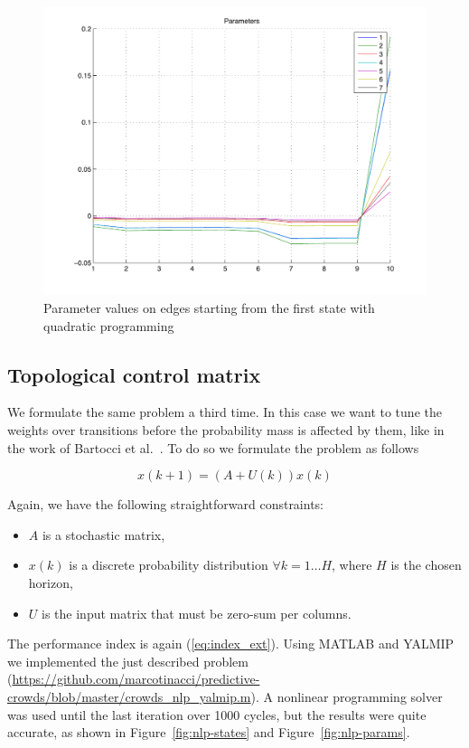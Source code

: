 \documentclass[a4paper, 11pt]{article}
\theoremstyle{definition}
\theoremstyle{remark}
\begin{document}
\begin{figure}[htbp!]
	\begin{center}
	\includegraphics[width=.8\textwidth]{images/qp-params}
	\end{center}
	\caption{Parameter values on edges starting from the first state with quadratic programming}
	\label{fig:qp-params}
\end{figure}

\subsection{Topological control matrix} %
\label{sub:topological_control_matrix}

We formulate the same problem a third time. In this case we want to tune the weights over transitions before the probability mass is affected by them, like in the work of Bartocci et al.~\cite{DBLP:conf/tacas/2011}. To do so we formulate the problem as follows

\begin{equation}\label{eq:top-system}
	x(k+1) = (A+U(k)) x(k)
\end{equation}

Again, we have the following straightforward constraints:
\begin{itemize}
	\item $A$ is a stochastic matrix,
	\item $x(k)$ is a discrete probability distribution $\forall k=1\dots H$, where $H$ is the chosen horizon,
	\item $U$ is the input matrix that must be zero-sum per columns.
\end{itemize}

The performance index is again (\ref{eq:index_ext}). Using MATLAB and YALMIP we implemented the just described problem (\url{https://github.com/marcotinacci/predictive-crowds/blob/master/crowds_nlp_yalmip.m}). A nonlinear programming solver was used until the last iteration over 1000 cycles, but the results were quite accurate, as shown in Figure~\ref{fig:nlp-states} and Figure~\ref{fig:nlp-params}.
\end{document}
